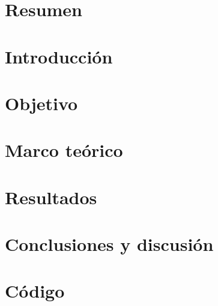 \documentclass[12pt,letterpaper]{article}
\begin{document}

\tableofcontents
\pagebreak
\section{Resumen}

\section{Introducción}

\section{Objetivo}

\section{Marco teórico}

\section{Resultados}

\section{Conclusiones y discusión}

\section{Código}



\end{document}
